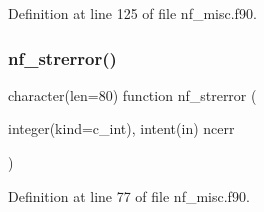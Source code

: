 Definition at line 125 of file nf\+\_\+misc.\+f90.

\mbox{\label{nf__misc_8f90_a5dc92cfb84f35ead3ef8cb519ee515e6}} 
\subsubsection{\texorpdfstring{nf\+\_\+strerror()}{nf\_strerror()}}
{\footnotesize\ttfamily character(len=80) function nf\+\_\+strerror (\begin{DoxyParamCaption}\item[{integer(kind=c\+\_\+int), intent(in)}]{ncerr }\end{DoxyParamCaption})}



Definition at line 77 of file nf\+\_\+misc.\+f90.

